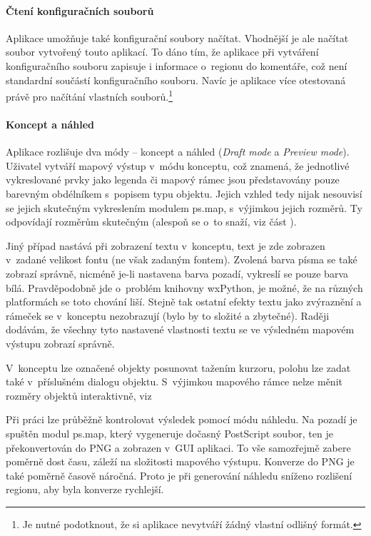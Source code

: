 \documentclass[a4paper,12pt,draft]{article}
\begin{document}
\paragraph*{Čtení konfiguračních souborů}
Aplikace umožňuje také konfigurační soubory načítat. Vhodnější
je ale načítat soubor vytvořený touto aplikací. To dáno tím, že
aplikace při vytváření konfiguračního souboru zapisuje i informace
o~regionu do komentáře, což není standardní součástí konfiguračního
souboru. Navíc je aplikace více otestovaná právě pro načítání
vlastních souborů.\footnote{Je nutné podotknout, že si aplikace nevytváří
žádný vlastní odlišný formát.}

\paragraph*{Koncept a náhled}
Aplikace rozlišuje dva módy -- koncept a náhled (\emph{Draft mode}
a \emph{Preview mode}).
Uživatel vytváří mapový výstup v~módu konceptu, což znamená,
že jednotlivé vykreslované prvky jako legenda či mapový rámec jsou
představovány pouze barevným obdélníkem s~popisem typu objektu. Jejich
vzhled tedy nijak nesouvisí se jejich skutečným vykreslením modulem
ps.map, s~výjimkou jejich rozměrů. Ty odpovídají rozměrům
skutečným (alespoň se o~to snaží, viz část ).

Jiný případ nastává při zobrazení textu v~konceptu, text je zde
zobrazen v~zadané velikost fontu (ne však zadaným fontem). Zvolená
barva písma se také zobrazí správně, nicméně je-li nastavena barva
pozadí, vykreslí se pouze barva bílá. Pravděpodobně jde o~problém
knihovny wxPython, je možné, že na různých platformách se toto chování
liší. Stejně tak ostatní efekty textu jako zvýraz\-nění a rámeček
se v~konceptu nezobrazují (bylo by to složité a zbytečné). Raději
dodávám, že všechny tyto nastavené vlastnosti textu se ve výsledném
mapovém výstupu zobrazí správně.

V~konceptu lze označené objekty posunovat tažením kurzoru, polohu lze
zadat také v~příslušném dialogu objektu. S~výjimkou mapového rámce
nelze měnit rozměry objektů interaktivně, viz 

Při práci lze průběžně kontrolovat výsledek pomocí módu náhledu. Na
pozadí je spuštěn modul ps.map, který vygeneruje dočasný
PostScript soubor, ten je pře\-konvertován do PNG a zobrazen v~GUI
aplikaci. To vše samozřejmě zabere poměrně dost času, záleží na
složitosti mapového výstupu. Konverze do PNG je také poměrně časově
náročná. Proto je při generování náhledu sníženo rozlišení regionu, aby byla
konverze rychlejší.
\end{document}
